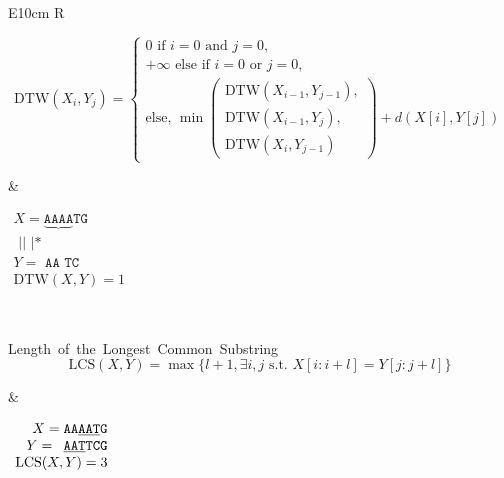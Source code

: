 \begin{table}
{\begin{tabularx}{\textwidth}{E{10cm}   R}
\begin{minipage}{10cm}
            $$ \mathrm{DTW}(X_i,Y_j)= \left\{
            \begin{array}{l}
                0 \mbox{ if } i=0 \mbox{ and } j=0 {,} \\
                +\infty \mbox{ else if } i=0 \mbox{ or } j=0 {,} \\
                \mbox{else, } \min 
                \begin{pmatrix}
                    \mathrm{DTW}(X_{i-1},Y_{j-1}), \\
                    \mathrm{DTW}(X_{i-1},Y_j), \\
                    \mathrm{DTW}(X_i,Y_{j-1})
                \end{pmatrix} + d(X[i],Y[j])
            \end{array} \right. $$
            \vspace{0.5cm}
        \end{minipage}
        &
        \hfill
        \begin{minipage}{4cm} \renewcommand{\arraystretch}{1}
            \hfill
        $\begin{array}{r}
            X= \underbrace{\mathrm{\texttt{AAAA}}}\mathrm{\texttt{TG}}\\
                \mathrm{\texttt{~||~|*}}\\
            Y= \mathrm{\texttt{~AA~TC}}\\
            \mathrm{DTW}(X,Y)=1
        \end{array}$ 
    \end{minipage}\\
    \begin{minipage}{10cm} \renewcommand{\arraystretch}{1}
        \small \mbox{Length of the Longest Common Substring} \\
        $$ \mathrm{LCS}(X,Y)= \max \{ l+1, \exists i,j \mbox{ s.t. } X[i:i+l]=Y[j:j+l] \}$$
        \end{minipage}
        &
        \hfill
        \begin{minipage}{4cm} \renewcommand{\arraystretch}{1}
            \hfill
        $\begin{array}{r}
            X= \mathrm{\texttt{AA\underline{AAT}G}}\\
            Y= \mathrm{\texttt{~\underline{AAT}TCG}}\\
            \mathrm{LCS}(X,Y)=3
        \end{array}$
        \vspace{0.5cm}
    \end{minipage}\\

\end{tabularx}}
\end{table}
